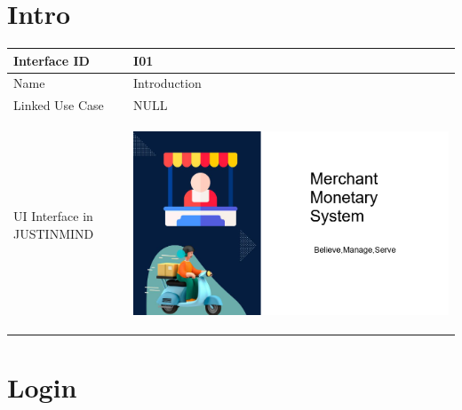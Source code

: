 \documentclass[12pt,a4paper]{report}
\begin{document}
\section{Intro}

\begin{tabular}{ | m{3cm} | m{12cm}| } \hline

Interface ID & I01  \\\hline

Name  	      & Introduction  \\ \hline

Linked Use Case & NULL \\ \hline

UI Interface in JUSTINMIND & \begin{center} \includegraphics[scale=0.3]{./User Interface/UI-001 Intro@1x.png}\end{center}  \\ \hline
\end{tabular} 
\section{Login}
\end{document}
